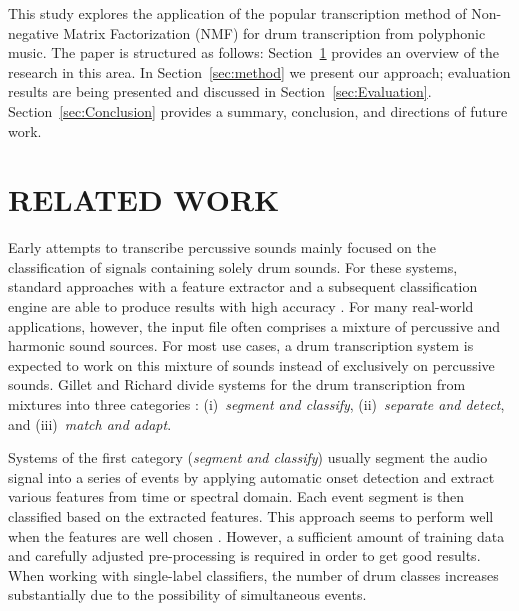 \documentclass[a4paper]{article}
\newcommand{\secref}[1]{\mbox{Section~\ref{#1}}}
\begin{document}
This study explores the application of the popular transcription method of Non-negative Matrix Factorization (NMF) for drum transcription from polyphonic music. The paper is structured as follows: \secref{sec:related work} provides an overview of the research in this area. In \secref{sec:method} we present our approach; evaluation results are being presented and discussed in \secref{sec:Evaluation}. \secref{sec:Conclusion} provides a summary, conclusion, and directions of future work. 
\vspace{-2mm}
\section{RELATED WORK}\label{sec:related work}

Early attempts to transcribe percussive sounds mainly focused on the classification of signals containing solely drum sounds. For these systems, standard approaches with a feature extractor and a subsequent classification engine are able to produce results with high accuracy \cite{%
herrera_automatic_2003}. For many real-world applications, however, the input file often comprises a mixture of percussive and harmonic sound sources. For most use cases, a drum transcription system is expected to work on this mixture of sounds instead of exclusively on percussive sounds. 
Gillet and Richard divide systems for the drum transcription from mixtures into three categories \cite{gillet_transcription_2008}: (i)~\textit{segment and classify}, (ii)~\textit{separate and detect}, and (iii)~\textit{match and adapt}.  

Systems of the first category (\textit{segment and classify}) usually segment the audio signal into a series of events by applying automatic onset detection and extract various features from time or spectral domain. Each event segment is then classified based on the extracted features. 
This approach seems to perform well when the features are well chosen \cite{gillet_automatic_2004, dittmar_Drum_2005}. However, a sufficient amount of training data and carefully adjusted pre-processing is required in order to get good results. When working with single-label classifiers, the number of drum classes increases substantially due to the possibility of simultaneous events.
\end{document}
